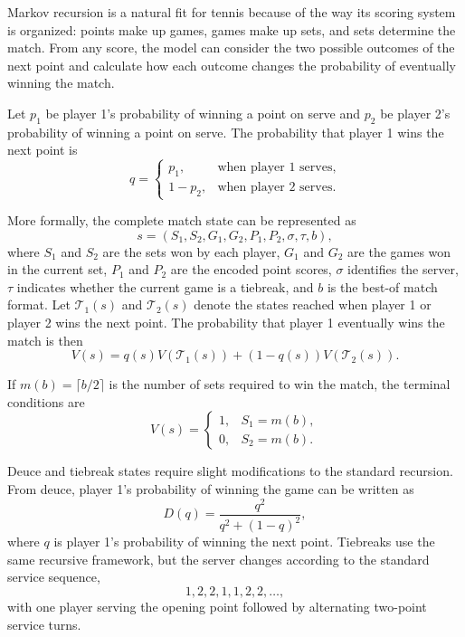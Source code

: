 \documentclass[10pt,twocolumn]{article}
\begin{document}
Markov recursion is a natural fit for tennis because of the way its scoring system is organized: points make up games, games make up sets, and sets determine the match.\cite{omalley2008} From any score, the model can consider the two possible outcomes of the next point and calculate how each outcome changes the probability of eventually winning the match.

Let $p_1$ be player 1's probability of winning a point on serve and $p_2$ be player 2's probability of winning a point on serve. The probability that player 1 wins the next point is
\begin{equation}
q=
\begin{cases}
p_1, & \text{when player 1 serves},\\
1-p_2, & \text{when player 2 serves}.
\end{cases}
\end{equation}

More formally, the complete match state can be represented as
\begin{equation}
s=(S_1,S_2,G_1,G_2,P_1,P_2,\sigma,\tau,b),
\end{equation}
where $S_1$ and $S_2$ are the sets won by each player, $G_1$ and $G_2$ are the games won in the current set, $P_1$ and $P_2$ are the encoded point scores, $\sigma$ identifies the server, $\tau$ indicates whether the current game is a tiebreak, and $b$ is the best-of match format. Let $\mathcal{T}_1(s)$ and $\mathcal{T}_2(s)$ denote the states reached when player 1 or player 2 wins the next point. The probability that player 1 eventually wins the match is then
\begin{equation}
V(s)=q(s)V\!\left(\mathcal{T}_1(s)\right)+\left(1-q(s)\right)V\!\left(\mathcal{T}_2(s)\right).
\end{equation}

If $m(b)=\lceil b/2\rceil$ is the number of sets required to win the match, the terminal conditions are
\begin{equation}
V(s)=
\begin{cases}
1, & S_1=m(b),\\
0, & S_2=m(b).
\end{cases}
\end{equation}

Deuce and tiebreak states require slight modifications to the standard recursion. From deuce, player 1's probability of winning the game can be written as
\begin{equation}
D(q)=\frac{q^2}{q^2+(1-q)^2},
\end{equation}
where $q$ is player 1's probability of winning the next point. Tiebreaks use the same recursive framework, but the server changes according to the standard service sequence,
\begin{equation}
1,2,2,1,1,2,2,\ldots,
\end{equation}
with one player serving the opening point followed by alternating two-point service turns.
\end{document}
